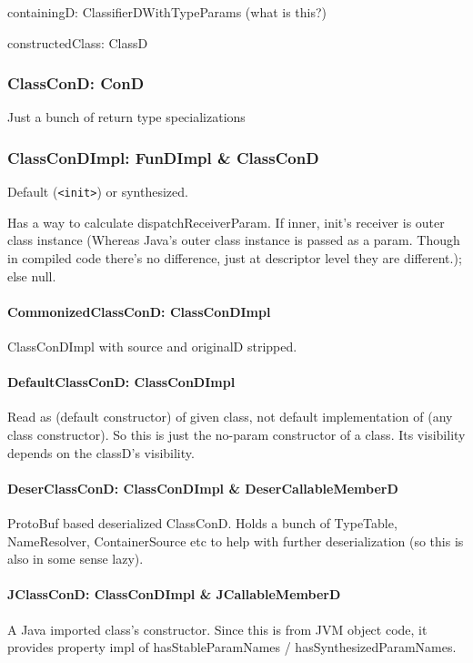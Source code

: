 \documentclass{article}
\begin{document}
containingD: ClassifierDWithTypeParams (what is this?)

constructedClass: ClassD

\subsubsection{ClassConD: ConD}

Just a bunch of return type specializations

\subsubsection{ClassConDImpl: FunDImpl \& ClassConD}

Default (\texttt{<init>}) or synthesized.

Has a way to calculate dispatchReceiverParam. If inner, init's receiver is outer class instance (Whereas Java's outer class instance is passed as a param. Though in compiled code there's no difference, just at descriptor level they are different.); else null.

\paragraph{CommonizedClassConD: ClassConDImpl}
ClassConDImpl with source and originalD stripped.

\paragraph{DefaultClassConD: ClassConDImpl}
Read as (default constructor) of given class, not default implementation of (any class constructor). So this is just the no-param constructor of a class. Its visibility depends on the classD's visibility.

\paragraph{DeserClassConD: ClassConDImpl \& DeserCallableMemberD}
ProtoBuf based deserialized ClassConD. Holds a bunch of TypeTable, NameResolver, ContainerSource etc to help with further deserialization (so this is also in some sense lazy).

\paragraph{JClassConD: ClassConDImpl \& JCallableMemberD}
A Java imported class's constructor. Since this is from JVM object code, it provides property impl of hasStableParamNames / hasSynthesizedParamNames.
\end{document}
